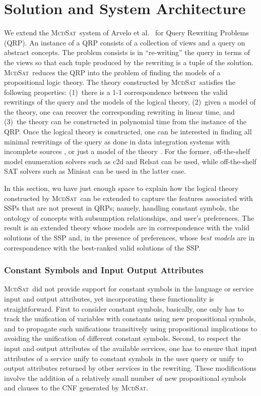 \documentclass{llncs}
\newcommand{\mcdsat}{\textsc{McdSat}}
\begin{document}
\section{Solution and System Architecture}

We extend the \mcdsat\ system of Arvelo et al.\ \cite{arvelo:aaai06} for
Query Rewriting Problems (QRP). An instance of a QRP consists of a
collection of views and a query on abstract concepts. 
The problem consists is in ``re-writing'' the query in terms of the
views so that each tuple produced by the rewriting is a tuple of the
solution.
\mcdsat\ reduces the QRP into the problem of finding the models of
a propositional logic theory.
The theory constructed by \mcdsat\ satisfies the following properties:
(1)~there is a 1-1 correspondence between the valid rewritings of the
query and the models of the logical theory, (2)~given a model of the theory,
one can recover the corresponding rewriting in linear time, and
(3)~the theory can be constructed in polynomial time from the instance 
of the QRP.
Once the logical theory is constructed, one can be interested in finding
all minimal rewritings of the query as done in data integration systems
with incomplete sources \cite{Ullman00}, or just a model of the theory
\cite{refs}. For the former, off-the-shelf model enumeration solvers
such as c2d \cite{c2d} and Relsat \cite{relsat} can be used, while 
off-the-shelf SAT solvers such as Minisat \cite{minisat} can be used in the
latter case.

In this section, wu have just enough space to explain how the logical theory
constructed by \mcdsat\ can be extended to capture the features associated
with SSPs that are not present in QRPs; namely, handling constant symbols,
the ontology of concepts with subsumption relationships, and user's
preferences. The result is an extended theory whose models are in correspondence
with the valid solutions of the SSP and, in the presence of preferences,
whose \emph{best models} are in correspondence with the best-ranked
valid solutions of the SSP.

\subsubsection{Constant Symbols and Input Output Attributes}

\mcdsat\ did not provide support for constant symbols in the language or service 
input and output attributes,
yet incorporating these functionality is straightforward.
First to consider constant symbols, basically, one only has to track the unification of variables with
constants using new propositional symbols, and to propagate such unifications
transitively using propositional implications to avoiding the unification
of different constant symbols. Second, to respect the input and output
attributes of the available services, one has to ensure that input attributes of a
service unify to constant symbols in the user query or unify to output attributes returned
by other services in the rewriting. These modifications involve the addition
of a relatively small number of new propositional symbols and clauses
to the CNF generated by \mcdsat.
\end{document}
